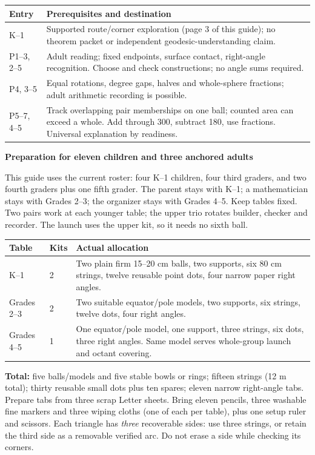 \documentclass[11pt,letterpaper]{article}
\newcommand{\topic}[1]{\par{\large\bfseries\color{blue}#1}\par}
\begin{document}
\begin{tabular}{@{}p{.82in}p{5.95in}@{}}
\toprule
Entry & Prerequisites and destination\\\midrule
K--1 & Supported route/corner exploration (page 3 of this guide); no theorem packet or independent geodesic-understanding claim.\\
P1--3, 2--5 & Adult reading; fixed endpoints, surface contact, right-angle recognition. Choose and check constructions; no angle sums required.\\
P4, 3--5 & Equal rotations, degree gaps, halves and whole-sphere fractions; adult arithmetic recording is possible.\\
P5--7, 4--5 & Track overlapping pair memberships on one ball; counted area can exceed a whole. Add through 300, subtract 180, use fractions. Universal explanation by readiness.\\\bottomrule
\end{tabular}

\newpage
\topic{Preparation for eleven children and three anchored adults}
This guide uses the current roster: four K--1 children, four third graders, and two fourth graders plus one fifth grader. The parent stays with K--1; a mathematician stays with Grades 2--3; the organizer stays with Grades 4--5. Keep tables fixed. Two pairs work at each younger table; the upper trio rotates builder, checker and recorder. The launch uses the upper kit, so it needs no sixth ball.

\begin{tabular}{@{}p{1.04in}p{.56in}p{5.17in}@{}}
\toprule
Table & Kits & Actual allocation\\\midrule
K--1 & 2 & Two plain firm 15--20 cm balls, two supports, six 80 cm strings, twelve reusable point dots, four narrow paper right angles.\\
Grades 2--3 & 2 & Two suitable equator/pole models, two supports, six strings, twelve dots, four right angles.\\
Grades 4--5 & 1 & One equator/pole model, one support, three strings, six dots, three right angles. Same model serves whole-group launch and octant covering.\\\bottomrule
\end{tabular}

\textbf{Total:} five balls/models and five stable bowls or rings; fifteen strings (12 m total); thirty reusable small dots plus ten spares; eleven narrow right-angle tabs. Prepare tabs from three scrap Letter sheets. Bring eleven pencils, three washable fine markers and three wiping cloths (one of each per table), plus one setup ruler and scissors. Each triangle has \emph{three} recoverable sides: use three strings, or retain the third side as a removable verified arc. Do not erase a side while checking its corners.
\end{document}
